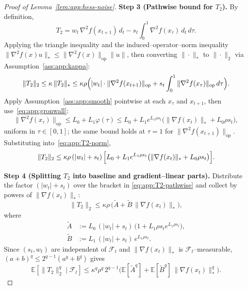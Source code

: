 \documentclass{article}
\theoremstyle{plain}
\theoremstyle{definition}
\theoremstyle{remark}
\begin{document}
\begin{proof}[Proof of Lemma~\ref{lem:app:hess-noise}]
\smallskip\noindent\textbf{Step 3 (Pathwise bound for $T_2$).}
By definition,
\[
  T_2 = w_t\, \nabla^2 f(x_{t+1})\, d_t
    - s_t \int_0^1 \nabla^2 f(x_\tau)\, d_t\, d\tau.
\]
Applying the triangle inequality and the induced--operator--norm
inequality $\|\nabla^2 f(x) u\|_* \leq \|\nabla^2 f(x)\|_{\mathrm{op}}
\|u\|$, then converting $\|\cdot\|_*$ to $\|\cdot\|_2$ via
Assumption~\ref{ass:app:kappa}:
\begin{equation}
  \|T_2\|_2 \leq \kappa\, \|T_2\|_*
  \leq \kappa\rho\Bigl(|w_t|\cdot \|\nabla^2 f(x_{t+1})\|_{\mathrm{op}}
    + s_t \int_0^1 \|\nabla^2 f(x_\tau)\|_{\mathrm{op}}\, d\tau\Bigr).
  \label{eq:app:T2-norm}
\end{equation}
Apply Assumption~\ref{ass:app:smooth} pointwise at each $x_\tau$ and
$x_{t+1}$, then use~\eqref{eq:app:gronwall}:
\[
  \|\nabla^2 f(x_\tau)\|_{\mathrm{op}}
  \leq L_0 + L_1 \varphi(\tau)
  \leq L_0 + L_1 e^{L_1\rho s_t}\bigl(\|\nabla f(x_t)\|_* + L_0\rho s_t\bigr),
\]
uniform in $\tau \in [0,1]$; the same bound holds at $\tau = 1$ for
$\|\nabla^2 f(x_{t+1})\|_{\mathrm{op}}$. Substituting
into~\eqref{eq:app:T2-norm},
\begin{equation}
  \|T_2\|_2
  \leq \kappa\rho\, (|w_t| + s_t)\,\Bigl[L_0
    + L_1 e^{L_1\rho s_t}\bigl(\|\nabla f(x_t)\|_* + L_0 \rho s_t\bigr)\Bigr].
  \label{eq:app:T2-pathwise}
\end{equation}

\smallskip\noindent\textbf{Step 4 (Splitting $T_2$ into baseline and gradient--linear parts).}
Distribute the factor $(|w_t| + s_t)$ over the bracket in
\eqref{eq:app:T2-pathwise} and collect by powers of $\|\nabla
f(x_t)\|_*$:
\[
  \|T_2\|_2 \leq \kappa\rho\,\bigl(\widetilde A
    + \widetilde B\, \|\nabla f(x_t)\|_*\bigr),
\]
where
\begin{align}
  \widetilde A &:= L_0\, (|w_t| + s_t)\,
    \bigl(1 + L_1\rho s_t e^{L_1\rho s_t}\bigr),
  \label{eq:app:A-tilde} \\
  \widetilde B &:= L_1\, (|w_t| + s_t)\, e^{L_1\rho s_t}.
  \label{eq:app:B-tilde}
\end{align}
Since $(s_t, w_t)$ are independent of $\mathcal{F}_t$ and $\|\nabla
f(x_t)\|_*$ is $\mathcal{F}_t$--measurable, $(a+b)^q \leq 2^{q-1}(a^q +
b^q)$ gives
\begin{equation}
  \mathbb{E}[\|T_2\|_2^q \mid \mathcal{F}_t]
  \leq \kappa^q \rho^q\, 2^{q-1}
    \bigl(\mathbb{E}[\widetilde A^q]
      + \mathbb{E}[\widetilde B^q]\, \|\nabla f(x_t)\|_*^q\bigr).
  \label{eq:app:T2-cond}
\end{equation}


\end{proof}
\end{document}
